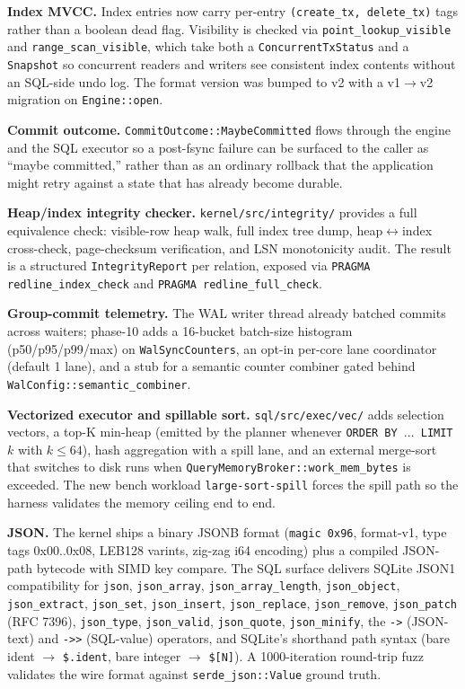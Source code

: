 \textbf{Index MVCC.} Index entries now carry per-entry
\texttt{(create\_tx, delete\_tx)} tags rather than a boolean dead flag.
Visibility is checked via \texttt{point\_lookup\_visible} and
\texttt{range\_scan\_visible}, which take both a
\texttt{ConcurrentTxStatus} and a \texttt{Snapshot} so concurrent
readers and writers see consistent index contents without an
SQL-side undo log. The format version was bumped to v2 with a
v1$\rightarrow$v2 migration on \texttt{Engine::open}.

\textbf{Commit outcome.} \texttt{CommitOutcome::MaybeCommitted} flows
through the engine and the SQL executor so a post-fsync failure can
be surfaced to the caller as ``maybe committed,'' rather than as an
ordinary rollback that the application might retry against a state
that has already become durable.

\textbf{Heap/index integrity checker.}
\texttt{kernel/src/integrity/} provides a full equivalence check:
visible-row heap walk, full index tree dump, heap$\leftrightarrow$index
cross-check, page-checksum verification, and LSN monotonicity audit.
The result is a structured \texttt{IntegrityReport} per relation,
exposed via \texttt{PRAGMA redline\_index\_check} and
\texttt{PRAGMA redline\_full\_check}.

\textbf{Group-commit telemetry.} The WAL writer thread already
batched commits across waiters; phase-10 adds a 16-bucket batch-size
histogram (p50/p95/p99/max) on \texttt{WalSyncCounters}, an opt-in
per-core lane coordinator (default 1 lane), and a stub for a semantic
counter combiner gated behind \texttt{WalConfig::semantic\_combiner}.

\textbf{Vectorized executor and spillable sort.}
\texttt{sql/src/exec/vec/} adds selection vectors, a top-K min-heap
(emitted by the planner whenever \texttt{ORDER BY $\dots$ LIMIT $k$}
with $k\le 64$), hash aggregation with a spill lane, and an external
merge-sort that switches to disk runs when
\texttt{QueryMemoryBroker::work\_mem\_bytes} is exceeded. The new
bench workload \texttt{large-sort-spill} forces the spill path so
the harness validates the memory ceiling end to end.

\textbf{JSON.} The kernel ships a binary JSONB format
(\texttt{magic 0x96}, format-v1, type tags 0x00..0x08, LEB128
varints, zig-zag i64 encoding) plus a compiled JSON-path bytecode
with SIMD key compare. The SQL surface delivers SQLite JSON1
compatibility for \texttt{json}, \texttt{json\_array},
\texttt{json\_array\_length}, \texttt{json\_object},
\texttt{json\_extract}, \texttt{json\_set}, \texttt{json\_insert},
\texttt{json\_replace}, \texttt{json\_remove}, \texttt{json\_patch}
(RFC 7396), \texttt{json\_type}, \texttt{json\_valid},
\texttt{json\_quote}, \texttt{json\_minify}, the \texttt{->}
(JSON-text) and \texttt{->>} (SQL-value) operators, and SQLite's
shorthand path syntax (bare ident $\rightarrow$ \texttt{\$.ident},
bare integer $\rightarrow$ \texttt{\$[N]}). A 1000-iteration
round-trip fuzz validates the wire format against
\texttt{serde\_json::Value} ground truth.

